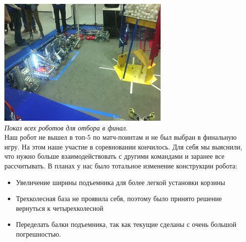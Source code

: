 	\includegraphics{Days/21-24.11.14/11_4_robot.png}\\
	\emph{Показ всех роботов для отбора в финал}.\\
 Наш робот не вышел в топ-5 по матч-поинтам и не был выбран в финальную игру. На этом наше участие в соревновании кончилось. Для себя мы выяснили, что нужно больше взаимодействовать с другими командами и заранее все рассчитывать.
В планах у нас было тотальное изменение конструкции робота:
\begin{itemize}
	\item Увеличение ширины подъемника для более легкой установки корзины
	\item Трехколесная база не проявила себя, поэтому было принято решение вернуться к четырехколесной
	\item Переделать балки подъемника, так как текущие сделаны с очень большой погрешностью. 
\end{itemize}
\fillpage
